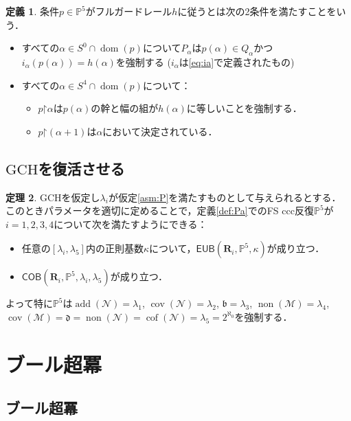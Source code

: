 \documentclass[uplatex,dvipdfmx]{jsarticle}
\newcommand{\dom}{\operatorname{dom}}
\newcommand{\non}{\operatorname{non}}
\newcommand{\cov}{\operatorname{cov}}
\newcommand{\add}{\operatorname{add}}
\newcommand{\cof}{\operatorname{cof}}
\newcommand{\GCH}{\mathrm{GCH}}
\newcommand{\EUB}{\mathsf{EUB}}
\newcommand{\COB}{\mathsf{COB}}
\newcommand{\relR}{\mathbf{R}}
\newcommand{\on}{\mathord\upharpoonright}
\newcommand{\Pa}{\mathbb{P}^5}
\newcommand{\covnull}{\cov(\mathcal N)}
\newcommand{\cofnull}{\cof(\mathcal N)}
\newcommand{\addnull}{\add(\mathcal N)}
\newcommand{\nonnull}{\non(\mathcal N)}
\newcommand{\covmeager}{\cov(\mathcal M)}
\newcommand{\nonmeager}{\non(\mathcal M)}
\theoremstyle{definition}
\newtheorem{thm}{定理}
\newtheorem{defi}[thm]{定義}
\begin{document}
	\begin{defi}
		条件$p\in \Pa$がフルガードレール$h$に従うとは次の2条件を満たすことをいう．
		\begin{itemize}
			\item 
			すべての$\alpha\in S^0 \cap \dom(p)$について$P_\alpha$は$p(\alpha)\in Q_\alpha$かつ$i_\alpha(p(\alpha)) = h(\alpha)$を強制する ($i_\alpha$は\eqref{eq:ia}で定義されたもの)
			\item  すべての$\alpha\in S^4\cap \dom(p)$について：
			\begin{itemize}
				\item  $p\on\alpha$は$p(\alpha)$の幹と幅の組が$h(\alpha)$に等しいことを強制する．
				\item $p \on (\alpha+1)$は$\alpha$において決定されている．
			\end{itemize}
		\end{itemize}       
	\end{defi}
		
	\subsection{$\GCH$を復活させる}
	
	
	\begin{thm}\label{thm:Pa}
		GCHを仮定し$\lambda_i$が仮定\ref{asm:P}を満たすものとして与えられるとする．
		このときパラメータを適切に定めることで，定義\ref{def:Pa}でのFS ccc反復$\Pa$が$i=1,2,3,4$について次を満たすようにできる：
		\begin{itemize} 
			\item  任意の$[\lambda_i,\lambda_5]$内の正則基数$\kappa$について，$\EUB(\relR_i, \Pa,\kappa)$が成り立つ．
			\item $\COB(\relR_i, \Pa,\lambda_i,\lambda_5)$が成り立つ．
		\end{itemize}
		よって特に$\Pa$は$\addnull=\lambda_1$, $\covnull=\lambda_2$, 
		$\mathfrak{b}=\lambda_3$, $\nonmeager=\lambda_4$,
		$\covmeager=\mathfrak{d}=\nonnull=\cofnull=\lambda_5=2^{\aleph_0}$を強制する．
	\end{thm}
	
	\section{ブール超冪}
	
	\subsection{ブール超冪}
	
\end{document}
